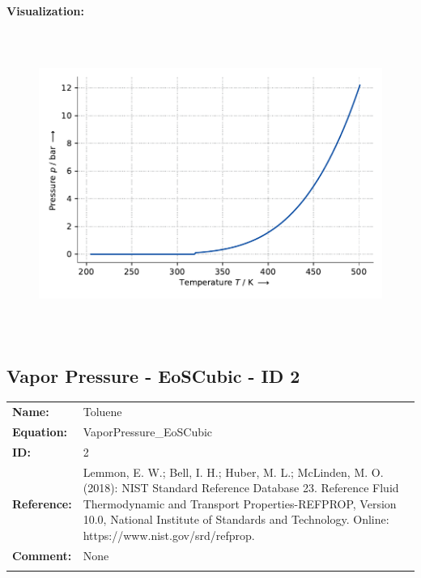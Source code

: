 \textbf{Visualization:}
%
\begin{figure}[!htp]
{\noindent\includegraphics[height=10cm, keepaspectratio]{figs/ref/ref_Toluene_VaporPressure_EoSCubic_1.pdf}}
\end{figure}
%

\FloatBarrier
\newpage
\subsection{Vapor Pressure - EoSCubic - ID 2}
%
\begin{tabular}[l]{|lp{11.5cm}|}
\hline
\addlinespace

\textbf{Name:} & Toluene \\
\textbf{Equation:} & VaporPressure\_EoSCubic \\
\textbf{ID:} & 2 \\
\textbf{Reference:} & Lemmon, E. W.; Bell, I. H.; Huber, M. L.; McLinden, M. O. (2018): NIST Standard Reference Database 23. Reference Fluid Thermodynamic and Transport Properties-REFPROP, Version 10.0, National Institute of Standards and Technology. Online: https://www.nist.gov/srd/refprop. \\
\textbf{Comment:} & None \\

\addlinespace
\hline
\end{tabular}
\newline

